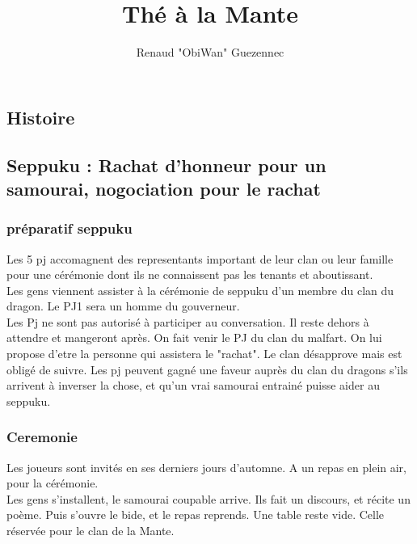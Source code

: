 \documentclass[oneside,12pt]{book}
\title{Thé à la Mante}
\author{Renaud "ObiWan" Guezennec}
\date{}
\begin{document}
\maketitle \clearpage
\tableofcontents \clearpage

\begin{flushleft}
\chapter{Histoire}

\section{Seppuku : Rachat d'honneur pour un samourai, nogociation pour le rachat}
\subsection{préparatif seppuku}
Les 5 pj accomagnent des representants important de leur clan ou leur famille pour une cérémonie dont ils ne connaissent pas les tenants et aboutissant. \\ 
Les gens viennent assister à la cérémonie de seppuku d'un membre du clan du dragon.
Le PJ1 sera un homme du gouverneur.\\ 
Les Pj ne sont pas autorisé à participer au conversation. Il reste dehors à attendre et mangeront après. 
On fait venir le PJ du clan du malfart. On lui propose d'etre la personne qui assistera le "rachat". 
Le clan désapprove mais est obligé de suivre. Les pj peuvent gagné une faveur auprès du clan du dragons s'ils arrivent à inverser la chose, et qu'un vrai samourai entrainé puisse aider au seppuku. \\


\subsection{Ceremonie}
Les joueurs sont invités en ses derniers jours d'automne. A un repas en plein air, pour la cérémonie. \\ 
Les gens s'installent, le samourai coupable arrive. Ils fait un discours, et récite un poème. Puis s'ouvre le bide, et le repas reprends. Une table reste vide. Celle réservée pour le clan de la Mante. \\


\end{flushleft}
\end{document}
